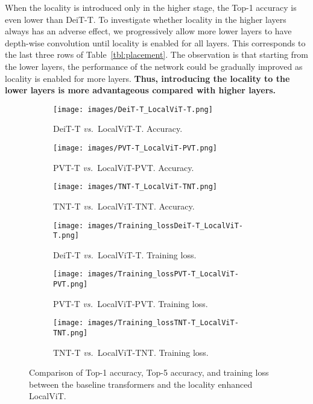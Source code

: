 \documentclass[10pt,twocolumn,letterpaper]{article}
\def\vs{\emph{vs.\ }}
\begin{document}
When the locality is introduced only in the higher stage, the Top-1 accuracy is even lower than DeiT-T. To investigate whether locality in the higher layers always has an adverse effect, we progressively allow more lower layers to have depth-wise convolution until locality is enabled for all layers. This corresponds to the last three rows of Table~\ref{tbl:placement}. The observation is that starting from the lower layers, the performance of the network could be gradually improved as locality is enabled for more layers. \textbf{Thus, introducing the locality to the lower layers is more advantageous compared with higher layers.}


\begin{figure*}
    \centering
    \begin{subfigure}[t]{0.325\textwidth}
        \centering
        \texttt{[image: images/DeiT-T\_LocalViT-T.png]}
        \caption{{DeiT-T \vs LocalViT-T. Accuracy.}}
        \label{fig:accuracy1}
    \end{subfigure}
    \begin{subfigure}[t]{0.325\textwidth}
        \centering
        \texttt{[image: images/PVT-T\_LocalViT-PVT.png]}
        \caption{{PVT-T \vs LocalViT-PVT. Accuracy.}}
        \label{fig:accuracy1}
    \end{subfigure}
    \begin{subfigure}[t]{0.325\textwidth}
        \centering
        \texttt{[image: images/TNT-T\_LocalViT-TNT.png]}
        \caption{TNT-T \vs LocalViT-TNT. Accuracy.}
        \label{fig:accuracy3}
    \end{subfigure}
    
    \begin{subfigure}[t]{0.325\textwidth}
        \centering
        \texttt{[image: images/Training\_lossDeiT-T\_LocalViT-T.png]}
        \caption{DeiT-T \vs LocalViT-T. Training loss.}
        \label{fig:training_loss1}
    \end{subfigure}
    \begin{subfigure}[t]{0.325\textwidth}
        \centering
        \texttt{[image: images/Training\_lossPVT-T\_LocalViT-PVT.png]}
        \caption{PVT-T \vs LocalViT-PVT. Training loss.}
        \label{fig:training_loss2}
    \end{subfigure}
    \begin{subfigure}[t]{0.325\textwidth}
        \centering
        \texttt{[image: images/Training\_lossTNT-T\_LocalViT-TNT.png]}
        \caption{TNT-T \vs LocalViT-TNT. Training loss.}
        \label{fig:training_loss3}
    \end{subfigure}
    \caption{Comparison of Top-1 accuracy, Top-5 accuracy, and training loss between the baseline transformers and the locality enhanced LocalViT. }
    \label{fig:training_log}
\end{figure*}
\end{document}
